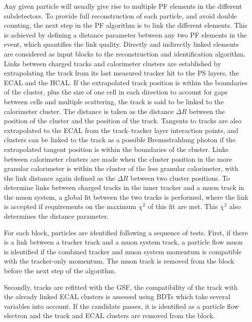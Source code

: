 Any given particle will usually give rise to multiple \ac{PF}
elements in the different subdetectors. To provide full reconstruction
of each particle, and avoid double counting,  the next step in the
\ac{PF} algorithm is to link the different elements. This is
achieved by defining a distance parameter between any two \ac{PF} elements
in the event, which quantifies the link quality. Directly and indirectly
linked elements are considered as input blocks to the reconstruction and
identification algorithm. Links between charged tracks and calorimeter
clusters are established by extrapolating the track from its last measured
tracker hit to the \ac{PS} layers, the \ac{ECAL} and the \ac{HCAL}. %
If the extrapolated track position is within the boundaries of the cluster, plus the size
of one cell in each direction to account for gaps between cells and multiple scattering, the
track is said to be linked to the calorimeter cluster. The distance is taken as the distance $\Delta R$ 
between the position of the cluster and the position of the track. Tangents to tracks are also extrapolated
to the ECAL from the track--tracker layer interaction points, and clusters can be 
linked to the track as a possible Bremsstrahlung photon if the extrapolated tangent
position is within the boundaries of the cluster.
Links between calorimeter clusters are made when the cluster position in the
more granular calorimeter is within the cluster of the less granular calorimeter,
with the link distance again defined as the $\Delta R$ between two cluster positions.
To determine links between charged tracks in the inner tracker and a muon track
in the muon system, a global fit between the two tracks is performed, where the link
is accepted if requirements on the maximum $\chi^2$ of this fit are met. This
$\chi^2$ also determines the distance parameter.

For each block, particles are identified following a sequence
of tests. First, if there is a link between a tracker track and a muon system track,
a particle flow muon is identified if the combined tracker and muon system
momentum is compatible with the tracker-only momentum. %
The muon track is removed from the block before the next step of the algorithm.

Secondly, tracks are refitted with the \ac{GSF}, the compatibility
of the track with the already linked \ac{ECAL} clusters is assessed using
\ac{BDTs} which take several variables into account. If the candidate
passes, it is identified as a particle flow electron and the track and
\ac{ECAL} clusters are removed from the block.


